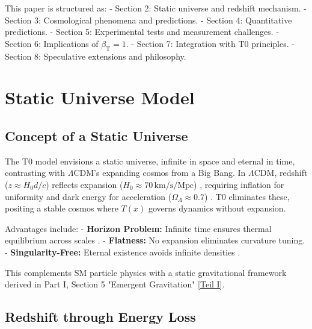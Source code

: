 \documentclass[twocolumn,aps,prl]{revtex4-2}
\newcommand{\Tfield}{T(x)}
\newcommand{\betaT}{\beta_{\text{T}}}
\newcommand{\LCDM}{\Lambda\text{CDM}}
\begin{document}
	This paper is structured as:
	- Section 2: Static universe and redshift mechanism.
	- Section 3: Cosmological phenomena and predictions.
	- Section 4: Quantitative predictions.
	- Section 5: Experimental tests and measurement challenges.
	- Section 6: Implications of \(\betaT = 1\).
	- Section 7: Integration with T0 principles.
	- Section 8: Speculative extensions and philosophy.
	
	\section{Static Universe Model}
	\label{sec:static_universe}
	
	\subsection{Concept of a Static Universe}
	\label{subsec:static_concept}
	
	The T0 model envisions a static universe, infinite in space and eternal in time, contrasting with \(\LCDM\)’s expanding cosmos from a Big Bang. In \(\LCDM\), redshift (\(z \approx H_0 d / c\)) reflects expansion (\(H_0 \approx 70 \, \text{km/s/Mpc}\)) \cite{Planck2020}, requiring inflation for uniformity and dark energy for acceleration (\(\Omega_{\Lambda} \approx 0.7\)) \cite{Riess1998}. T0 eliminates these, positing a stable cosmos where \(\Tfield\) governs dynamics without expansion.
	
	Advantages include:
	- \textbf{Horizon Problem:} Infinite time ensures thermal equilibrium across scales \cite{pascher_messdifferenzen_2025}.
	- \textbf{Flatness:} No expansion eliminates curvature tuning.
	- \textbf{Singularity-Free:} Eternal existence avoids infinite densities \cite{pascher_perspective_2025}.
	
	This complements SM particle physics with a static gravitational framework derived in Part I, Section 5 "Emergent Gravitation" \href{https://github.com/jpascher/T0-Time-Mass-Duality/tree/main/2/pdf/English/Bridging Quantum Mechanics and Relativity through Time-Mass Duality Part I Theoretical Foundations_en.pdf}{[Teil I]}.
	
	\subsection{Redshift through Energy Loss}
	\label{subsec:redshift_energy_loss}
	
\end{document}
